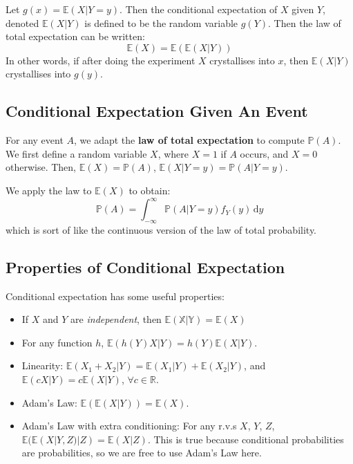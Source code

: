 \documentclass{article}
\begin{document}
\begin{definition}
    Let $g(x) = \mathbb{E}(X | Y = y)$. Then the conditional expectation of $X$ given $Y$, denoted $ \mathbb{E}(X | Y)$ is defined to be the random variable $g(Y)$. Then the law of total expectation can be written: \begin{equation}
        \mathbb{E}(X) = \mathbb{E}(\mathbb{E}(X | Y))
    \end{equation}
    \noindent In other words, if after doing the experiment $X$ crystallises into $x$, then $ \mathbb{E}(X | Y)$ crystallises into $g(y)$. 
\end{definition}


\subsection{Conditional Expectation Given An Event}

For any event $A$, we adapt the \textbf{law of total expectation} to compute $\mathbb{P}(A)$. We first define a random variable $X$, where $X = 1$ if $A$ occurs, and $X = 0$ otherwise. Then, $\mathbb{E}(X) = \mathbb{P}(A)$, $\mathbb{E}(X | Y = y) = \mathbb{P}(A | Y = y)$. 

\begin{theorem}
    We apply the law to $\mathbb{E}(X)$ to obtain: \begin{equation}
        \mathbb{P}(A) = \int_{-\infty}^{\infty} \mathbb{P}(A | Y = y) f_Y (y) \, \mathrm{d} y
    \end{equation}
    \noindent which is sort of like the continuous version of the law of total probability. 
\end{theorem}

\subsection{Properties of Conditional Expectation}

Conditional expectation has some useful properties:

\begin{itemize}
    \item If $X$ and $Y$ are \textit{independent}, then $ \mathbb{E(X | Y)} = \mathbb{E}(X)$
    \item For any function $h$, $ \mathbb{E}(h(Y) X|Y) = h(Y)\mathbb{E}(X|Y)$. 
    \item Linearity: $ \mathbb{E}(X_{1} + X_{2} | Y) = \mathbb{E}(X_{1} | Y) + \mathbb{E}(X_{2} | Y)$, and $ \mathbb{E}(cX | Y) = c \mathbb{E}(X | Y)$, $\forall c \in \mathbb{R}$. 
    \item Adam's Law: $ \mathbb{E}(\mathbb{E}(X | Y)) = \mathbb{E}(X)$. 
    \item Adam's Law with extra conditioning: For any r.v.s $X$, $Y$, $Z$, $\mathbb{E}(\mathbb{E}(X | Y, Z) | Z) = \mathbb{E}(X | Z)$. This is true because conditional probabilities are probabilities, so we are free to use Adam's Law here. 
\end{itemize}
\end{document}
